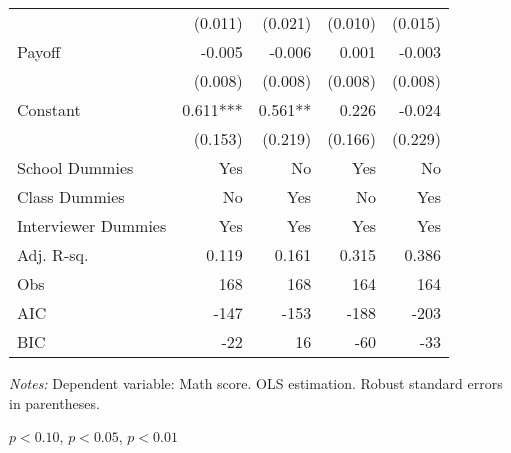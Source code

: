 \begin{table}[!h]
\begin{threeparttable}
\begin{tabular}{l*{4}{D{.}{.}{-1}}}
                    &             (0.011)   &             (0.021)   &             (0.010)   &             (0.015)   \\
Payoff              &              -0.005   &              -0.006   &               0.001   &              -0.003   \\
                    &             (0.008)   &             (0.008)   &             (0.008)   &             (0.008)   \\
Constant            &               0.611***&               0.561** &               0.226   &              -0.024   \\
                    &             (0.153)   &             (0.219)   &             (0.166)   &             (0.229)   \\
School Dummies      &                 Yes   &                  No   &                 Yes   &                  No   \\
Class Dummies       &                  No   &                 Yes   &                  No   &                 Yes   \\
Interviewer Dummies &                 Yes   &                 Yes   &                 Yes   &                 Yes   \\
\midrule
Adj. R-sq.          &               0.119   &               0.161   &               0.315   &               0.386   \\
Obs                 &                 168   &                 168   &                 164   &                 164   \\
AIC                 &                -147   &                -153   &                -188   &                -203   \\
BIC                 &                 -22   &                  16   &                 -60   &                 -33   \\
\bottomrule
\end{tabular}
\begin{tablenotes}
\footnotesize
\item \textit{Notes:} Dependent variable: Math score. OLS estimation. Robust standard errors in parentheses.
\item \sym{*} \(p<0.10\), \sym{**} \(p<0.05\), \sym{***} \(p<0.01\)
\end{tablenotes}
\end{threeparttable}
\label{tab:rev_cause}
\end{table}